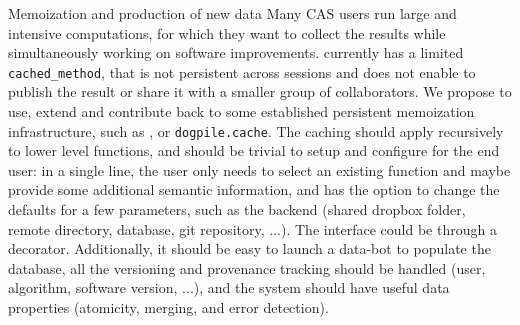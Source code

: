 \begin{Workpackage}{\thewpno}
\begin{task}{Memoization and production of new data}
\label{task:data_memo}
Many CAS users run large and intensive computations, for which they want to collect the results while simultaneously working on software improvements. \Sage currently has a limited \lstinline{cached_method}, that is not persistent across sessions and does not enable to publish the result or share it with a smaller group of collaborators. We propose to use, extend and contribute back to some established persistent memoization infrastructure, such as ,  or \texttt{dogpile.cache}. The caching should apply recursively to lower level functions, and should be trivial to setup and configure for the end user: in a single line, the user only needs to select an existing function and maybe provide some additional semantic information, and has the option to change the defaults for a few parameters, such as the backend (shared dropbox folder, remote directory, database, git repository, ...). The interface could be through a \Python decorator. 
Additionally, it should be easy to launch a data-bot to populate the database, all the versioning and provenance tracking should be handled (user, algorithm, software version, ...), and the system should have useful data properties (atomicity, merging, and error detection). 
\end{task}

\end{Workpackage}
